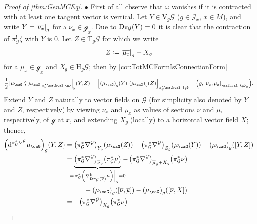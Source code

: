 \documentclass[reqno,a4paper,oneside]{amsart}
\newcommand\mutot{\mu_\caG}
\theoremstyle{plain}
\theoremstyle{remark}
\theoremstyle{definition}
\begin{document}
\begin{proof}[Proof of \ref{thm:GenMCEq}]
$\bullet$ First of all observe that $\omega$ vanishes if it is contracted with at least one tangent vector is vertical. Let $Y \in \mathrm{V}_g\mathcal{G}$ ($g \in \mathcal{G}_x$, $x \in M$), and write $Y = \mleft.\overline{\nu_x}\mright|_g$ for a $\nu_x \in \mathcal{g}_x$. Due to $\mathrm{D}\pi_{\mathcal{G}} \mleft( Y \mright) = 0$ it is clear that the contraction of $\pi_{\mathcal{G}}^! \zeta$ with $Y$ is 0. Let $Z \in \mathrm{T}_g\mathcal{G}$ for which we write
\begin{equation*}
Z 
\coloneqq
\mleft.\overline{\mu_x}\mright|_g
	+ X_g
\end{equation*}
for a $\mu_x \in \mathcal{g}_x$ and $X_g \in \mathrm{H}_g\mathcal{G}$;
then by \ref{cor:TotMCFormIsConnectionForm}
\begin{equation*}
\frac{1}{2} \mleft.\mleft[ \mutot \stackrel{\wedge}{,} \mutot \mright]_{\pi_{\mathcal{G}}^*\mathcal{g}}\mright|_g (Y, Z)
=
\mleft[ \mleft(\mutot\mright)_g(Y), \mleft(\mutot\mright)_g(Z) \mright]_{\pi_{\mathcal{G}}^*\mathcal{g}}
=
\mleft( g,
\mleft[ \nu_x, \mu_x \mright]_{\mathcal{g}_x}
\mright).
\end{equation*}
Extend $Y$ and $Z$ naturally to vector fields on $\mathcal{G}$ (for simplicity also denoted by $Y$ and $Z$, respectively) by viewing $\nu_x$ and $\mu_x$ as values of sections $\nu$ and $\mu$, respectively, of $\mathcal{g}$ at $x$, and extending $X_g$ (locally) to a horizontal vector field $X$; thence,
\begin{align*}
\mleft(\mathrm{d}^{\pi_{\mathcal{G}}^*\nabla^{\mathcal{G}}} \mutot\mright)_g(Y, Z)
&=
\mleft( \pi_{\mathcal{G}}^*\nabla^{\mathcal{G}} \mright)_{Y_g} \mleft( \mutot(Z) \mright)
	- \mleft( \pi_{\mathcal{G}}^*\nabla^{\mathcal{G}} \mright)_{Z_g} \mleft( \mutot(Y) \mright)
	- \mleft(\mutot\mright)_g\mleft( [Y, Z] \mright)
\\
&=
{\underbrace{\mleft( \pi_{\mathcal{G}}^*\nabla^{\mathcal{G}} \mright)_{\overline{\nu}_g} \mleft( \pi^*_{\mathcal{G}}\mu \mright)}
	_{\mathclap{ = \mleft. \pi^*_{\mathcal{G}}\mleft( \nabla^{\mathcal{G}}_{\mathrm{D} \pi_{\mathcal{G}} \mleft( \overline{\nu} \mright)} \mu \mright) \mright|_g = 0 }}}
	- \mleft( \pi_{\mathcal{G}}^*\nabla^{\mathcal{G}} \mright)_{\overline{\mu}_g + X_g} \mleft( \pi^*_{\mathcal{G}}\nu \mright)
\\
&\hspace{1cm}
	- \mleft(\mutot\mright)_g\mleft( [\overline{\nu}, \overline{\mu}] \mright)
	- \mleft(\mutot\mright)_g\mleft( [\overline{\nu}, X] \mright)
\\
&=
- \mleft( \pi_{\mathcal{G}}^*\nabla^{\mathcal{G}} \mright)_{X_g} \mleft( \pi^*_{\mathcal{G}}\nu \mright)

\end{align*}
\end{proof}
\end{document}
